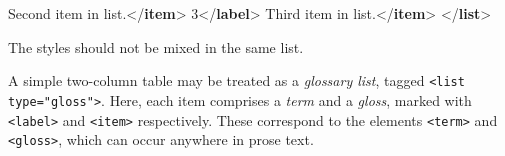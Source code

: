 \documentclass[11pt,twoside]{article}\makeatletter
\begin{document}
\begin{shaded}
Second item in list.{</\textbf{item}>}\mbox{}\newline 
{}3{</\textbf{label}>}\mbox{}\newline 
{}Third item in list.{</\textbf{item}>}\mbox{}\newline 
{</\textbf{list}>}\end{shaded}\egroup\par \noindent  The styles should not be mixed in the same list.\par A simple two-column table may be treated as a \emph{glossary
list}, tagged \texttt{<list type="gloss">}.  Here, each item
comprises a \emph{term} and a \emph{gloss}, marked with
\texttt{<label>} and \texttt{<item>} respectively.  These correspond to
the elements \texttt{<term>} and \texttt{<gloss>}, which can occur
anywhere in prose text.
\end{document}
